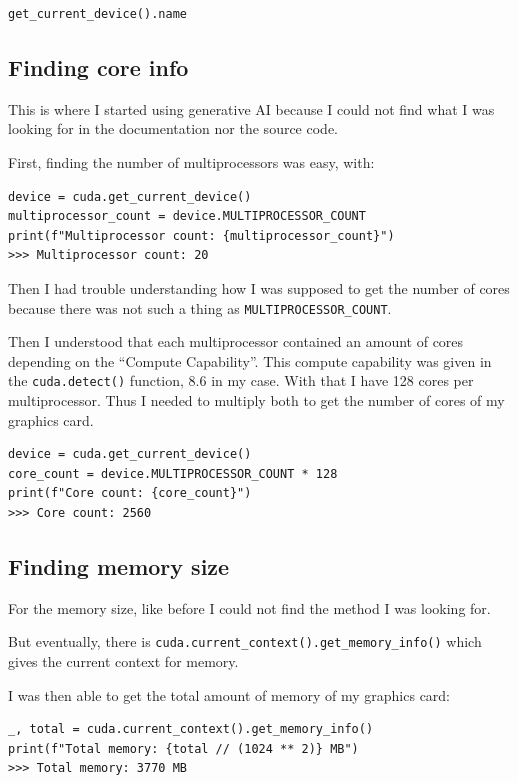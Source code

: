 \documentclass{article}
\begin{document}
\begin{lstlisting}
get_current_device().name
\end{lstlisting}

\subsection{Finding core info}

This is where I started using generative AI because I could not find what I was looking for in the documentation nor the source code.

First, finding the number of multiprocessors was easy, with:

\begin{lstlisting}
device = cuda.get_current_device()
multiprocessor_count = device.MULTIPROCESSOR_COUNT
print(f"Multiprocessor count: {multiprocessor_count}")
>>> Multiprocessor count: 20
\end{lstlisting}

Then I had trouble understanding how I was supposed to get the number of cores because there was not such a thing as \texttt{MULTIPROCESSOR\_COUNT}.

Then I understood that each multiprocessor contained an amount of cores depending on the ``Compute Capability''. This compute capability was given in the \texttt{cuda.detect()} function, 8.6 in my case. With that I have 128 cores per multiprocessor. Thus I needed to multiply both to get the number of cores of my graphics card.

\begin{lstlisting}
device = cuda.get_current_device()
core_count = device.MULTIPROCESSOR_COUNT * 128
print(f"Core count: {core_count}")
>>> Core count: 2560
\end{lstlisting}

\subsection{Finding memory size}

For the memory size, like before I could not find the method I was looking for.

But eventually, there is \texttt{cuda.current\_context().get\_memory\_info()} which gives the current context for memory.

I was then able to get the total amount of memory of my graphics card:

\begin{lstlisting}
_, total = cuda.current_context().get_memory_info()
print(f"Total memory: {total // (1024 ** 2)} MB")
>>> Total memory: 3770 MB
\end{lstlisting}
\end{document}

